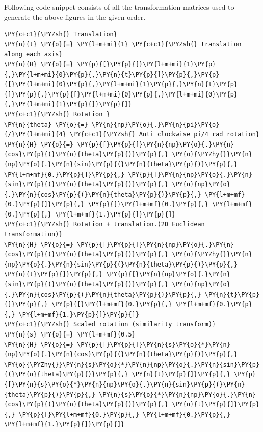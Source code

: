 \documentclass[a4paper,11pt]{article}%
\begin{document}
Following code snippet consists of all the transformation matrices used to generate the above figures in the given order.\\ 	
    \begin{tcolorbox}[breakable, size=fbox, boxrule=1pt, pad at break*=1mm,colback=cellbackground, colframe=cellborder]
\begin{Verbatim}[commandchars=\\\{\}]
\PY{c+c1}{\PYZsh{} Translation}
\PY{n}{t} \PY{o}{=} \PY{l+m+mi}{1} \PY{c+c1}{\PYZsh{} translation along each axis}
\PY{n}{H} \PY{o}{=} \PY{p}{[}\PY{p}{[}\PY{l+m+mi}{1}\PY{p}{,}\PY{l+m+mi}{0}\PY{p}{,}\PY{n}{t}\PY{p}{]}\PY{p}{,}\PY{p}{[}\PY{l+m+mi}{0}\PY{p}{,}\PY{l+m+mi}{1}\PY{p}{,}\PY{n}{t}\PY{p}{]}\PY{p}{,}\PY{p}{[}\PY{l+m+mi}{0}\PY{p}{,}\PY{l+m+mi}{0}\PY{p}{,}\PY{l+m+mi}{1}\PY{p}{]}\PY{p}{]}
\PY{c+c1}{\PYZsh{} Rotation }
\PY{n}{theta} \PY{o}{=} \PY{n}{np}\PY{o}{.}\PY{n}{pi}\PY{o}{/}\PY{l+m+mi}{4} \PY{c+c1}{\PYZsh{} Anti clockwise pi/4 rad rotation}
\PY{n}{H} \PY{o}{=} \PY{p}{[}\PY{p}{[}\PY{n}{np}\PY{o}{.}\PY{n}{cos}\PY{p}{(}\PY{n}{theta}\PY{p}{)}\PY{p}{,} \PY{o}{\PYZhy{}}\PY{n}{np}\PY{o}{.}\PY{n}{sin}\PY{p}{(}\PY{n}{theta}\PY{p}{)}\PY{p}{,} \PY{l+m+mf}{0.}\PY{p}{]}\PY{p}{,} \PY{p}{[}\PY{n}{np}\PY{o}{.}\PY{n}{sin}\PY{p}{(}\PY{n}{theta}\PY{p}{)}\PY{p}{,} \PY{n}{np}\PY{o}{.}\PY{n}{cos}\PY{p}{(}\PY{n}{theta}\PY{p}{)}\PY{p}{,} \PY{l+m+mf}{0.}\PY{p}{]}\PY{p}{,} \PY{p}{[}\PY{l+m+mf}{0.}\PY{p}{,} \PY{l+m+mf}{0.}\PY{p}{,} \PY{l+m+mf}{1.}\PY{p}{]}\PY{p}{]}
\PY{c+c1}{\PYZsh{} Rotation + translation.(2D Euclidean transformation)}
\PY{n}{H} \PY{o}{=} \PY{p}{[}\PY{p}{[}\PY{n}{np}\PY{o}{.}\PY{n}{cos}\PY{p}{(}\PY{n}{theta}\PY{p}{)}\PY{p}{,} \PY{o}{\PYZhy{}}\PY{n}{np}\PY{o}{.}\PY{n}{sin}\PY{p}{(}\PY{n}{theta}\PY{p}{)}\PY{p}{,} \PY{n}{t}\PY{p}{]}\PY{p}{,} \PY{p}{[}\PY{n}{np}\PY{o}{.}\PY{n}{sin}\PY{p}{(}\PY{n}{theta}\PY{p}{)}\PY{p}{,} \PY{n}{np}\PY{o}{.}\PY{n}{cos}\PY{p}{(}\PY{n}{theta}\PY{p}{)}\PY{p}{,} \PY{n}{t}\PY{p}{]}\PY{p}{,} \PY{p}{[}\PY{l+m+mf}{0.}\PY{p}{,} \PY{l+m+mf}{0.}\PY{p}{,} \PY{l+m+mf}{1.}\PY{p}{]}\PY{p}{]}
\PY{c+c1}{\PYZsh{} Scaled rotation (similarity transform)}
\PY{n}{s} \PY{o}{=} \PY{l+m+mf}{0.5}
\PY{n}{H} \PY{o}{=} \PY{p}{[}\PY{p}{[}\PY{n}{s}\PY{o}{*}\PY{n}{np}\PY{o}{.}\PY{n}{cos}\PY{p}{(}\PY{n}{theta}\PY{p}{)}\PY{p}{,} \PY{o}{\PYZhy{}}\PY{n}{s}\PY{o}{*}\PY{n}{np}\PY{o}{.}\PY{n}{sin}\PY{p}{(}\PY{n}{theta}\PY{p}{)}\PY{p}{,} \PY{n}{t}\PY{p}{]}\PY{p}{,} \PY{p}{[}\PY{n}{s}\PY{o}{*}\PY{n}{np}\PY{o}{.}\PY{n}{sin}\PY{p}{(}\PY{n}{theta}\PY{p}{)}\PY{p}{,} \PY{n}{s}\PY{o}{*}\PY{n}{np}\PY{o}{.}\PY{n}{cos}\PY{p}{(}\PY{n}{theta}\PY{p}{)}\PY{p}{,} \PY{n}{t}\PY{p}{]}\PY{p}{,} \PY{p}{[}\PY{l+m+mf}{0.}\PY{p}{,} \PY{l+m+mf}{0.}\PY{p}{,} \PY{l+m+mf}{1.}\PY{p}{]}\PY{p}{]}

\end{Verbatim}
\end{tcolorbox}
\end{document}
